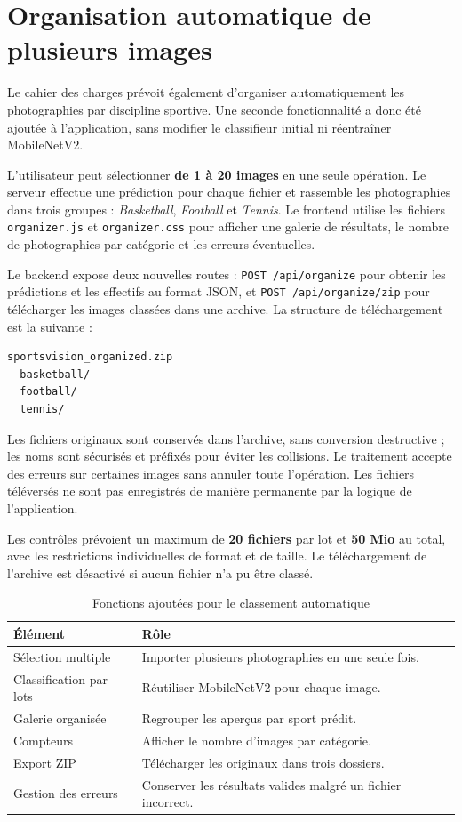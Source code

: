 \documentclass[11pt,a4paper,oneside]{report}
\begin{document}
\section{Organisation automatique de plusieurs images}
Le cahier des charges prévoit également d'organiser automatiquement les photographies par discipline sportive. Une seconde fonctionnalité a donc été ajoutée à l'application, sans modifier le classifieur initial ni réentraîner MobileNetV2.

L'utilisateur peut sélectionner \textbf{de 1 à 20 images} en une seule opération. Le serveur effectue une prédiction pour chaque fichier et rassemble les photographies dans trois groupes : \emph{Basketball}, \emph{Football} et \emph{Tennis}. Le frontend utilise les fichiers \texttt{organizer.js} et \texttt{organizer.css} pour afficher une galerie de résultats, le nombre de photographies par catégorie et les erreurs éventuelles.

Le backend expose deux nouvelles routes : \texttt{POST /api/organize} pour obtenir les prédictions et les effectifs au format JSON, et \texttt{POST /api/organize/zip} pour télécharger les images classées dans une archive. La structure de téléchargement est la suivante :
\begin{lstlisting}
sportsvision_organized.zip
  basketball/
  football/
  tennis/
\end{lstlisting}
Les fichiers originaux sont conservés dans l'archive, sans conversion destructive ; les noms sont sécurisés et préfixés pour éviter les collisions. Le traitement accepte des erreurs sur certaines images sans annuler toute l'opération. Les fichiers téléversés ne sont pas enregistrés de manière permanente par la logique de l'application.

Les contrôles prévoient un maximum de \textbf{20 fichiers} par lot et \textbf{50 Mio} au total, avec les restrictions individuelles de format et de taille. Le téléchargement de l'archive est désactivé si aucun fichier n'a pu être classé.

\begin{table}[H]\centering
\caption{Fonctions ajoutées pour le classement automatique}
\begin{tabularx}{\textwidth}{lX}
\toprule
\textbf{Élément} & \textbf{Rôle}\\
\midrule
Sélection multiple & Importer plusieurs photographies en une seule fois.\\
Classification par lots & Réutiliser MobileNetV2 pour chaque image.\\
Galerie organisée & Regrouper les aperçus par sport prédit.\\
Compteurs & Afficher le nombre d'images par catégorie.\\
Export ZIP & Télécharger les originaux dans trois dossiers.\\
Gestion des erreurs & Conserver les résultats valides malgré un fichier incorrect.\\
\bottomrule
\end{tabularx}
\end{table}
\end{document}
